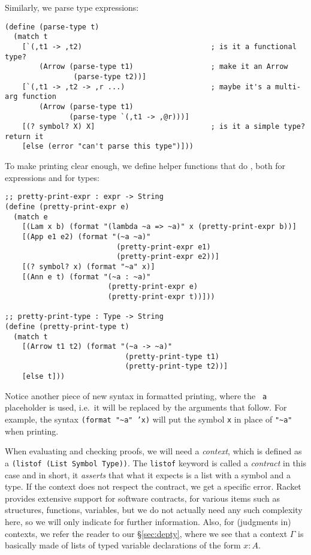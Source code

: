 Similarly, we parse type expressions:
{
  \small
\begin{verbatim}
(define (parse-type t)
  (match t
    [`(,t1 -> ,t2)                              ; is it a functional type?
        (Arrow (parse-type t1)                  ; make it an Arrow
                (parse-type t2))]
    [`(,t1 -> ,t2 -> ,r ...)                    ; maybe it's a multi-arg function
        (Arrow (parse-type t1)
               (parse-type `(,t1 -> ,@r)))]
    [(? symbol? X) X]                           ; is it a simple type? return it
    [else (error "can't parse this type")]))
\end{verbatim}
}

To make printing clear enough, we define helper functions that do
, both for expressions and for types:
{
  \small
\begin{verbatim}
;; pretty-print-expr : expr -> String
(define (pretty-print-expr e)
  (match e
    [(Lam x b) (format "(lambda ~a => ~a)" x (pretty-print-expr b))]
    [(App e1 e2) (format "(~a ~a)"
                          (pretty-print-expr e1)
                          (pretty-print-expr e2))]
    [(? symbol? x) (format "~a" x)]
    [(Ann e t) (format "(~a : ~a)"
                        (pretty-print-expr e)
                        (pretty-print-expr t))]))

;; pretty-print-type : Type -> String
(define (pretty-print-type t)
  (match t
    [(Arrow t1 t2) (format "(~a -> ~a)"
                            (pretty-print-type t1)
                            (pretty-print-type t2))]
    [else t]))
\end{verbatim}
}

Notice another piece of new syntax in formatted printing,
where the \texttt{~a} placeholder is used, i.e.\ it will be
replaced by the arguments that follow. For example, the syntax
\texttt{(format "\~\!a" 'x)} will put the symbol \texttt{x}
in place of \texttt{"\~\!a"} when printing.

When evaluating and checking proofs, we will need a \emph{context},
which is defined as a \texttt{(listof (List Symbol Type))}. The
\texttt{listof} keyword is called a \emph{contract} in this case and
in short, it \emph{asserts} that what it expects is a list with a
symbol and a type. If the context does not respect the contract,
we get a specific error. Racket provides extensive support for software
contracts, for various items such as structures, functions, variables,
but we do not actually need any such complexity here, so we will
only indicate \cite{contract} for further information. Also, for
(judgments in) contexts, we refer the reader to our \S\ref{sec:depty},
where we see that a context $ \Gamma $ is basically made of lists of
typed variable declarations of the form $ x : A $.

